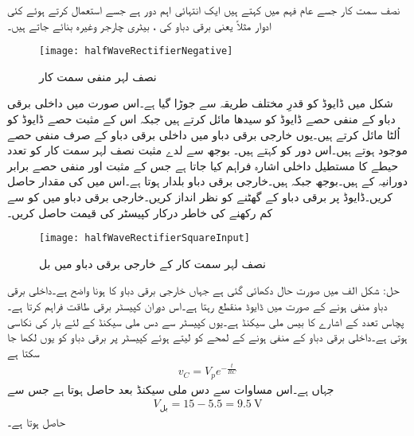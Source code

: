 نصف سمت کار جسے عام فہم میں  کہتے ہیں ایک انتہائی اہم دور ہے جسے استعمال کرتے ہوئے کئی ادوار مثلاً  یعنی برقی دباو کی  ، بیٹری چارجر وغیرہ بنائے جاتے ہیں۔
\begin{figure}
\centering
\texttt{[image: halfWaveRectifierNegative]}
\caption{نصف لہر منفی سمت کار}
\label{شکل_نصف_لہر_منفی_سمت_کار}
\end{figure}
شکل  میں ڈایوڈ کو قدرِ مختلف طریقہ سے جوڑا گیا ہے۔اس صورت میں داخلی برقی دباو  کے منفی حصے ڈایوڈ کو سیدھا مائل کرتے ہیں جبکہ اس کے مثبت حصے ڈایوڈ کو اُلٹا مائل کرتے ہیں۔یوں خارجی برقی دباو میں داخلی برقی دباو کے صرف منفی حصے موجود ہوتے ہیں۔اس دور کو  کہتے ہیں۔
بوجھ سے لدے مثبت نصف لہر سمت کار کو  تعدد  حیطے کا مستطیل داخلی اشارہ فراہم کیا جاتا ہے جس کے مثبت اور منفی حصے برابر دورانیہ کے ہیں۔بوجھ  جبکہ  ہیں۔خارجی برقی دباو بلدار ہوتا ہے۔اس میں  کی مقدار حاصل کریں۔ڈایوڈ پر برقی دباو کے گھٹنے کو نظر انداز کریں۔خارجی برقی دباو میں  کو  سے کم رکھنے کی خاطر درکار کپیسٹر کی قیمت حاصل کریں۔
\begin{figure}
\centering
\texttt{[image: halfWaveRectifierSquareInput]}
\caption{نصف لہر سمت کار کے خارجی برقی دباو میں بل}
\label{شکل_نصف_لہر_سمتکار_بل}
\end{figure}
حل:
شکل  الف میں صورت حال دکھائی گئی ہے جہاں خارجی برقی دباو کا  ہونا واضح ہے۔داخلی برقی دباو منفی ہونے کے صورت میں ڈایوڈ منقطع رہتا ہے۔اس دوران کپیسٹر  برقی طاقت فراہم کرتا ہے۔پچاس تعدد کے اشارے کا  بیس ملی سیکنڈ ہے۔یوں کپیسٹر سے دس ملی سیکنڈ کے لئے بار کی نکاسی ہوتی ہے۔داخلی برقی دباو کے منفی ہونے کے لمحے کو  لیتے ہوئے کپیسٹر پر برقی دباو  کو یوں لکھا جا سکتا ہے
\begin{align*}
v_C=V_p e^{-\frac{t}{RC}}
\end{align*}
جہاں  ہے۔اس مساوات سے دس ملی سیکنڈ بعد  حاصل ہوتا ہے جس سے
\begin{align*}
V_{\textrm{بل}}=15-5.5=\SI{9.5}{\volt}
\end{align*}
حاصل ہوتا ہے۔

